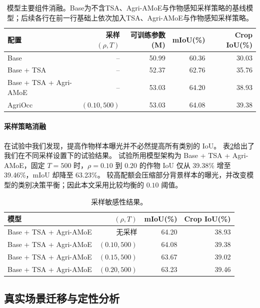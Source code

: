 \documentclass[a4paper,fleqn]{cas-sc}
\begin{document}
\begin{table}[pos=htbp]
\centering
\caption{模型主要组件消融。Base为不含TSA、Agri-AMoE与作物感知采样策略的基线模型；后续各行在前一行基础上依次加入TSA、Agri-AMoE与作物感知采样策略。}
\label{tab:ablation}
\begin{tabular}{lrrrr}
\toprule
配置 & 采样 $(\rho,T)$ & 可训练参数(M) & mIoU(\%) & Crop IoU(\%)\\
\midrule
Base & -- & 50.99 & 60.36 & 30.03\\
Base + TSA & -- & 52.37 & 62.76 & 35.76\\
Base + TSA + Agri-AMoE & -- & 53.03 & 64.20 & 38.93\\
AgriOcc & $(0.10,500)$ & 53.03 & 64.08 & 39.38\\
\bottomrule
\end{tabular}
\end{table}

\paragraph{采样策略消融}
在试验中我们发现，提高作物样本曝光并不必然提高所有类别的 IoU。
表\ref{tab:sampling}给出了我们在不同采样设置下的试验结果。
试验所用模型架构为 Base + TSA + Agri-AMoE，固定 $T=500$ 时，$\rho=0.10$ 到 $0.20$ 的作物 IoU 仅从 39.38\% 增至 39.46\%，mIoU 却降至 63.23\%。
较高配额会压缩部分背景样本的曝光，并改变模型的类别决策平衡；因此本文采用比较均衡的 $0.10$ 阈值。

\begin{table}[pos=htbp]
\centering
\caption{采样敏感性结果。}
\label{tab:sampling}
\begin{tabular}{lrrr}
\toprule
模型 & $(\rho,T)$ & mIoU(\%) & Crop IoU(\%)\\
\midrule
Base + TSA + Agri-AMoE & 无采样 & 64.20 & 38.93\\
Base + TSA + Agri-AMoE & $(0.10,500)$ & 64.08 & 39.38\\
Base + TSA + Agri-AMoE & $(0.15,500)$ & 63.67 & 39.02\\
Base + TSA + Agri-AMoE & $(0.20,500)$ & 63.23 & 39.46\\
\bottomrule
\end{tabular}
\end{table}



\subsection{真实场景迁移与定性分析}\label{sec:sim2real}
\end{document}
